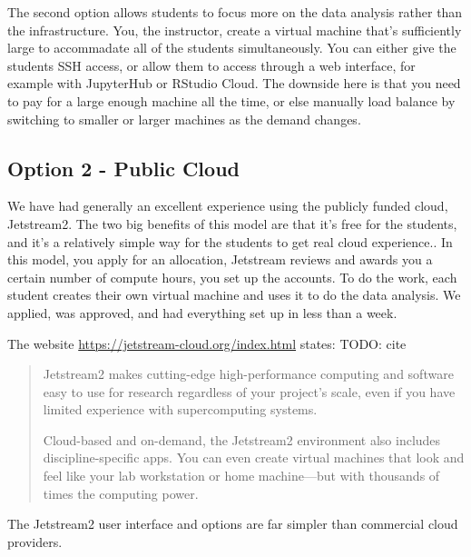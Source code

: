 \documentclass[12pt]{article}
\begin{document}
The second option allows students to focus more on the data analysis rather than the infrastructure.
You, the instructor, create a virtual machine that's sufficiently large to accommadate all of the students simultaneously.
You can either give the students SSH access, or allow them to access through a web interface, for example with JupyterHub or RStudio Cloud.
The downside here is that you need to pay for a large enough machine all the time, or else manually load balance by switching to smaller or larger machines as the demand changes.



\subsection{Option 2 - Public Cloud}

We have had generally an excellent experience using the publicly funded cloud, Jetstream2.
The two big benefits of this model are that it's free for the students, and it's a relatively simple way for the students to get real cloud experience..
In this model, you apply for an allocation, Jetstream reviews and awards you a certain number of compute hours, you set up the accounts.
To do the work, each student creates their own virtual machine and uses it to do the data analysis.
We applied, was approved, and had everything set up in less than a week.

The website \url{https://jetstream-cloud.org/index.html} states:
TODO: cite

\begin{quote}
Jetstream2 makes cutting-edge high-performance computing and software easy to use for research regardless of your project’s scale, even if you have limited experience with supercomputing systems.

Cloud-based and on-demand, the Jetstream2 environment also includes discipline-specific apps. You can even create virtual machines that look and feel like your lab workstation or home machine—but with thousands of times the computing power.
\end{quote}

The Jetstream2 user interface and options are far simpler than commercial cloud providers.
\end{document}
